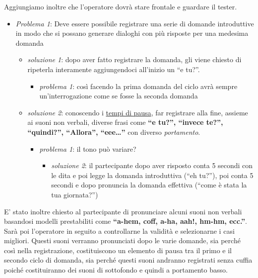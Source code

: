 \documentclass[
]{article}
\providecommand{\tightlist}{%
  \setlength{\itemsep}{0pt}\setlength{\parskip}{0pt}}
\begin{document}
Aggiungiamo inoltre che l'operatore dovrà stare frontale e guardare il tester.

\begin{itemize}
\tightlist
\item
  \emph{Problema 1}: Deve essere possibile registrare una serie di domande introduttive in modo che si possano generare dialoghi con più risposte per una medesima domanda

  \begin{itemize}
  \tightlist
  \item
    \emph{soluzione 1}: dopo aver fatto registrare la domanda, gli viene chiesto di ripeterla interamente aggiungendoci all'inizio un ``e tu?''.

    \begin{itemize}
    \tightlist
    \item
      \emph{problema 1}: così facendo la prima domanda del ciclo avrà sempre un'interrogazione come se fosse la seconda domanda
    \end{itemize}
  \item
    \emph{soluzione 2}: conoscendo i \hyperref[tempi-di-pausa]{tempi di pausa}, far registrare alla fine, assieme ai suoni non verbali, diverse frasi come \textbf{``e tu?'', ``invece te?'', ``quindi?'', ``Allora'', ``eee\ldots{}''} con diverso \emph{portamento}.

    \begin{itemize}
    \tightlist
    \item
      \emph{problema 1}: il tono può variare?

      \begin{itemize}
      \tightlist
      \item
        \emph{soluzione 2}: il partecipante dopo aver risposto conta 5 secondi con le dita e poi legge la domanda introduttiva (``eh tu?''), poi conta 5 secondi e dopo pronuncia la domanda effettiva (``come è stata la tua giornata?'')
      \end{itemize}
    \end{itemize}
  \end{itemize}
\end{itemize}

E' stato inoltre chiesto al partecipante di pronunciare alcuni suoni non verbali basandosi modelli prestabiliti come \textbf{``a-hem, coff, a-ha, aah!, hm-hm, ecc.''}. Sarà poi l'operatore in seguito a controllarne la validità e selezionarne i casi migliori. Questi suoni verranno pronunciati dopo le varie domande, sia perché così nella registrazione, costituiscono un elemento di pausa tra il primo e il secondo ciclo di domanda, sia perché questi suoni andranno registrati senza cuffia poiché costituiranno dei suoni di sottofondo e quindi a portamento basso.
\end{document}
